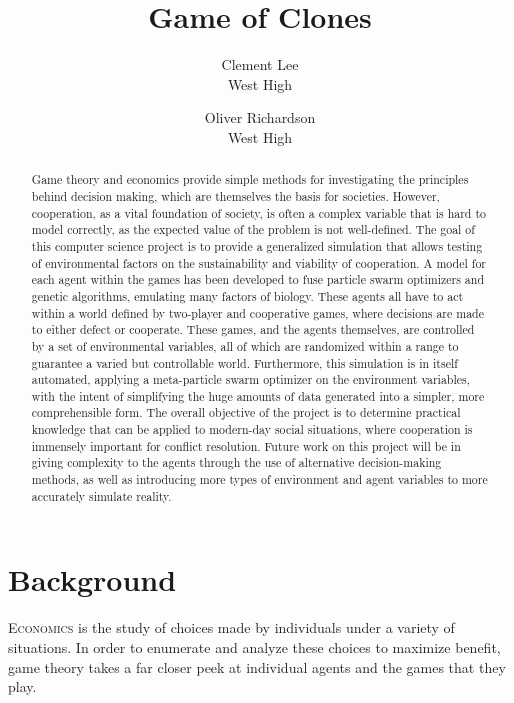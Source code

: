 \documentclass{article}
\begin{document}
\title{\Huge{Game of Clones}}
\author{Clement Lee\\
West High\and
Oliver Richardson\\
West High}
\maketitle

\begin{abstract}
Game theory and economics provide simple methods for investigating the principles behind decision making, which are themselves the basis for societies. However, cooperation, as a vital foundation of society, is often a complex variable that is hard to model correctly, as the expected value of the problem is not well-defined. The goal of this computer science project is to provide a generalized simulation that allows testing of environmental factors on the sustainability and viability of cooperation. A model for each agent within the games has been developed to fuse particle swarm optimizers and genetic algorithms, emulating many factors of biology. These agents all have to act within a world defined by two-player and cooperative games, where decisions are made to either defect or cooperate. These games, and the agents themselves, are controlled by a set of environmental variables, all of which are randomized within a range to guarantee a varied but controllable world. Furthermore, this simulation is in itself automated, applying a meta-particle swarm optimizer on the environment variables, with the intent of simplifying the huge amounts of data generated into a simpler, more comprehensible form. The overall objective of the project is to determine practical knowledge that can be applied to modern-day social situations, where cooperation is immensely important for conflict resolution. Future work on this project will be in giving complexity to the agents through the use of alternative decision-making methods, as well as introducing more types of environment and agent variables to more accurately simulate reality.
\end{abstract}

\section*{Background\dotfill}
\lettrine{E}{conomics} is the study of choices made by individuals under a variety of situations. In order to enumerate and analyze these choices to maximize benefit, game theory takes a far closer peek at individual agents and the games that they play. 
\end{document}
